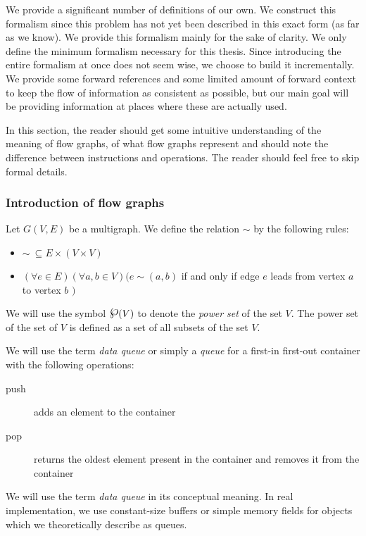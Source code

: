 
\label{sec:definitions}

We provide a significant number of definitions of our own. We construct this formalism since this problem has not yet been described in this exact form (as far as we know).  We provide this formalism mainly for the sake of clarity. We only define the minimum formalism necessary for this thesis. Since introducing the entire formalism at once does not seem wise, we choose to build it incrementally. We provide some forward references and some limited amount of forward context to keep the flow of information as consistent as possible, but our main goal will be providing information at places where these are actually used.


In this section, the reader should get some intuitive understanding of the meaning of flow graphs, of what flow graphs represent and should note the difference between instructions and operations. The reader should feel free to skip formal details.

\subsubsection{Introduction of flow graphs}

  Let $G(V,E)$ be a multigraph. We define the relation $\sim$ by the following rules: \begin{itemize}
  \item $\sim \ \subseteq E \times (V \times V)$ 
  \item $ (\forall e \in E)(\forall a,b \in V)( e \sim (a,b) $ if and only if edge $e$ leads from vertex $a$ to vertex $b$ $)$
  \end{itemize}
\myenddef


  We will use the symbol $\powerset(V)$ to denote the \emph{power set} of the set $V$. The power set of the set of $V$ is defined as a set of all subsets of the set $V$.
\myenddef


  We will use the term \emph{data queue} or simply a \emph{queue} for a first-in first-out container with the following operations:
  \begin{description}
  \item[push] adds an element to the container
  \item[pop] returns the oldest element present in the container and removes it from the container
  \end{description}
  We will use the term \emph{data queue} in its conceptual meaning. In real implementation, we use constant-size buffers or simple memory fields for objects which we theoretically describe as queues.
\myenddef


